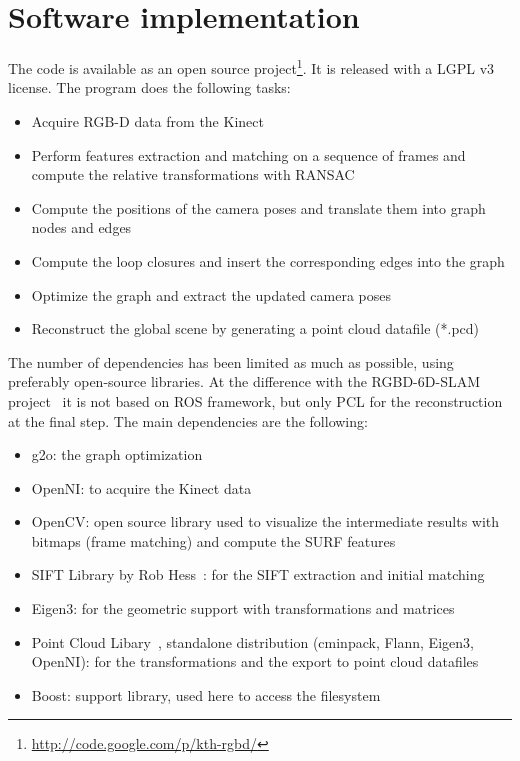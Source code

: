 \section{Software implementation}

The code is available as an open source project\footnote{\url{http://code.google.com/p/kth-rgbd/}}. It is released with a LGPL v3 license.
The program does the following tasks:
\begin{itemize}
\item Acquire RGB-D data from the Kinect
\item Perform features extraction and matching on a sequence of frames and compute the relative transformations with \gls{RANSAC}
\item Compute the positions of the camera poses and translate them into graph nodes and edges
\item Compute the loop closures and insert the corresponding edges into the graph
\item Optimize the graph and extract the updated camera poses
\item Reconstruct the global scene by generating a point cloud datafile (*.pcd)
\end{itemize}

The number of dependencies has been limited as much as possible, using preferably open-source libraries. At the difference with the RGBD-6D-SLAM project~\cite{engelhard11euron-workshop} it is not based on \gls{ROS} framework, but only \gls{PCL} for the reconstruction at the final step. The main dependencies are the following:
\begin{itemize}
\item g2o: the graph optimization
\item OpenNI: to acquire the Kinect data
\item OpenCV: open source library used to visualize the intermediate results with bitmaps (frame matching) and compute the \gls {SURF} features
\item SIFT Library by Rob Hess~\cite{hess_sift}: for the \gls{SIFT} extraction and initial matching
\item Eigen3: for the geometric support with transformations and matrices
\item Point Cloud Libary~\cite{Rusu_ICRA2011_PCL}, standalone distribution (cminpack, Flann, Eigen3, OpenNI): for the transformations and the export to point cloud datafiles
\item Boost: support library, used here to access the filesystem
\end{itemize}

